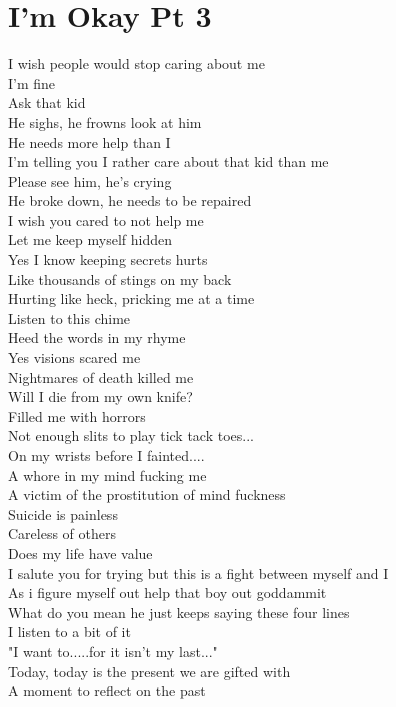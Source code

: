 \documentclass[12pt, b5paper]{article}
\begin{document}
\newpage 
\section{I'm Okay Pt 3}
I wish people would stop caring about me
\\I'm fine
\\Ask that kid
\\He sighs, he frowns look at him
\\He needs more help than I
\\I'm telling you I rather care about that kid than me
\\Please see him, he's crying
\\He broke down, he needs to be repaired
\\I wish you cared to not help me
\\Let me keep myself hidden
\\Yes I know keeping secrets hurts
\\Like thousands of stings on my back
\\Hurting like heck, pricking me at a time
\\Listen to this chime
\\Heed the words in my rhyme
\\Yes visions scared me
\\Nightmares of death killed me
\\Will I die from my own knife?
\\Filled me with horrors
\\Not enough slits to play tick tack toes...
\\On my wrists before I fainted....
\\A whore in my mind fucking me
\\A victim of the prostitution of mind fuckness
\\Suicide is painless
\\Careless of others
\\Does my life have value
\\I salute you for trying but this is a fight between myself and I
\\As i figure myself out help that boy out goddammit
\\What do you mean he just keeps saying these four lines
\\I listen to a bit of it
\\"I want to.....for it isn't my last..."
\\Today, today is the present we are gifted with
\\A moment to reflect on the past
\end{document}
